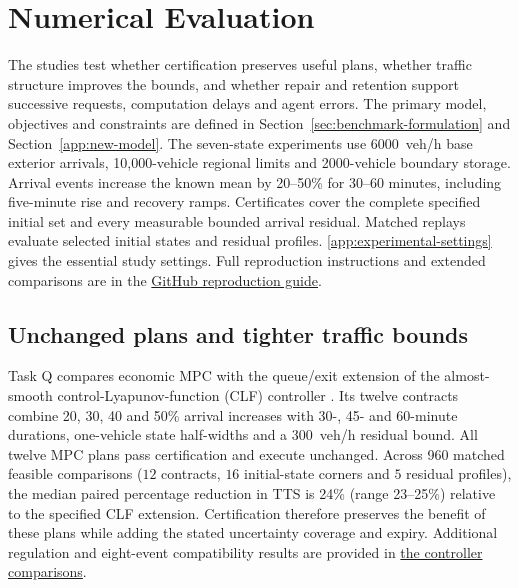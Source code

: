 \documentclass[preprint,12pt]{elsarticle}
\newcommand{\appref}[1]{\ref{#1}}
\newcommand{\reproductiondetails}[1]{\href{https://github.com/AlienEslami/agentic-perimeter-runtime-certification/blob/main/paper/supporting_materials/REPRODUCING_THE_REDUCED_PAPER.md}{#1}}
\begin{document}
\section{Numerical Evaluation}
\label{sec:new-evidence}

The studies test whether certification preserves useful plans, whether
traffic structure improves the bounds, and whether repair and retention
support successive requests, computation delays and agent errors.
The primary model, objectives and constraints are defined in
Section~\ref{sec:benchmark-formulation} and Section~\ref{app:new-model}.
The seven-state experiments use 6000~veh/h base exterior arrivals,
10,000-vehicle regional limits and 2000-vehicle boundary storage. Arrival
events increase the known mean by 20--50\% for 30--60 minutes, including
five-minute rise and recovery ramps. Certificates cover the complete
specified initial set and every measurable bounded arrival residual.
Matched replays evaluate selected initial states and residual profiles.
\appref{app:experimental-settings} gives the essential study settings.
Full reproduction instructions and extended comparisons are in the
\reproductiondetails{GitHub reproduction guide}.

\subsection{Unchanged plans and tighter traffic bounds}
\label{sec:new-incident-protocol}
\label{sec:controller-benchmarks}
\label{sec:structure-results}
\label{sec:new-mpc-results}
\label{sec:structure-online}
\label{sec:network-transfer-results}

Task Q compares economic MPC with the queue/exit extension of the
almost-smooth control-Lyapunov-function (CLF) controller \cite{geroliminis2013mpc,zhong2018robust}.
Its twelve contracts combine 20, 30, 40 and 50\% arrival increases with
30-, 45- and 60-minute durations, one-vehicle state half-widths and a
300~veh/h residual bound. All twelve MPC plans pass certification and
execute unchanged. Across 960 matched feasible comparisons
($12$ contracts, $16$ initial-state corners and $5$ residual profiles),
the median paired percentage reduction in TTS is 24\% (range 23--25\%)
relative to the specified CLF extension. Certification therefore preserves the benefit of these plans
while adding the stated uncertainty coverage and expiry. Additional
regulation and eight-event compatibility results are provided in
\reproductiondetails{the controller comparisons}.
\end{document}
